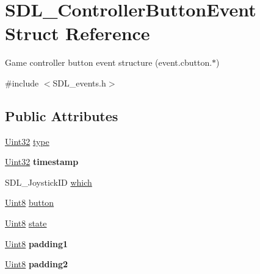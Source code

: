 \hypertarget{struct_s_d_l___controller_button_event}{}\section{S\+D\+L\+\_\+\+Controller\+Button\+Event Struct Reference}
\label{struct_s_d_l___controller_button_event}


Game controller button event structure (event.\+cbutton.$\ast$)  




{\ttfamily \#include $<$S\+D\+L\+\_\+events.\+h$>$}

\subsection*{Public Attributes}
\begin{DoxyCompactItemize}
\item 
\hyperlink{_s_d_l__stdinc_8h_add440eff171ea5f55cb00c4a9ab8672d}{Uint32} \hyperlink{struct_s_d_l___controller_button_event_a09869d792031e47a88673d85915c209f}{type}
\item 
\mbox{\label{struct_s_d_l___controller_button_event_a73003712734c4d2f966db3d7c2ce826b}} 
\hyperlink{_s_d_l__stdinc_8h_add440eff171ea5f55cb00c4a9ab8672d}{Uint32} {\bfseries timestamp}
\item 
S\+D\+L\+\_\+\+Joystick\+ID \hyperlink{struct_s_d_l___controller_button_event_a98777e88b5d5cae83eef16ffd4bcacc1}{which}
\item 
\hyperlink{_s_d_l__stdinc_8h_a2944638813a090aa23e62f4da842c3e2}{Uint8} \hyperlink{struct_s_d_l___controller_button_event_a039da6cd31c3c62e62a3ae17cc64d0db}{button}
\item 
\hyperlink{_s_d_l__stdinc_8h_a2944638813a090aa23e62f4da842c3e2}{Uint8} \hyperlink{struct_s_d_l___controller_button_event_a00c46683f86674c2a4f74404ee3e857c}{state}
\item 
\mbox{\label{struct_s_d_l___controller_button_event_a34d3e43fc1994288b9b083c874bc0899}} 
\hyperlink{_s_d_l__stdinc_8h_a2944638813a090aa23e62f4da842c3e2}{Uint8} {\bfseries padding1}
\item 
\mbox{\label{struct_s_d_l___controller_button_event_a8caf56a3921227913cfb652d5de1eec4}} 
\hyperlink{_s_d_l__stdinc_8h_a2944638813a090aa23e62f4da842c3e2}{Uint8} {\bfseries padding2}
\end{DoxyCompactItemize}


